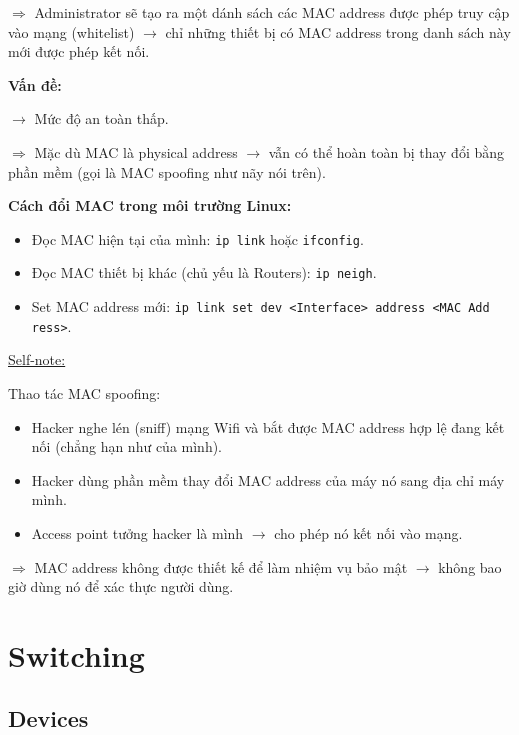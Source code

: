 $\Rightarrow$ Administrator sẽ tạo ra một dánh sách các MAC address được phép truy cập vào mạng (whitelist) $\rightarrow$ chỉ những thiết bị có MAC address trong danh sách này mới được phép kết nối.
\medskip

\noindent
\textbf{Vấn đề:}
\medskip

\noindent
$\rightarrow$ Mức độ an toàn thấp.

$\Rightarrow$ Mặc dù MAC là physical address $\rightarrow$ vẫn có thể hoàn toàn bị thay đổi bằng phần mềm (gọi là MAC spoofing như nãy nói trên).
\medskip

\noindent
\textbf{Cách đổi MAC trong môi trường Linux:}

\begin{itemize}
    \item Đọc MAC hiện tại của mình: \texttt{ip link} hoặc \texttt{ifconfig}.
    \item Đọc MAC thiết bị khác (chủ yếu là Routers): \texttt{ip neigh}.
    \item Set MAC address mới: \texttt{ip link set dev <Interface> address <MAC Add\\ress>}.
\end{itemize}
\medskip

\noindent
\underline{Self-note:}
\medskip

\noindent
Thao tác MAC spoofing:

\begin{itemize}
    \item Hacker nghe lén (sniff) mạng Wifi và bắt được MAC address hợp lệ đang kết nối (chẳng hạn như của mình).
    \item Hacker dùng phần mềm thay đổi MAC address của máy nó sang địa chỉ máy mình.
    \item Access point tưởng hacker là mình $\rightarrow$ cho phép nó kết nối vào mạng.
\end{itemize}
\medskip

\noindent
$\Rightarrow$ MAC address không được thiết kế để làm nhiệm vụ bảo mật $\rightarrow$ không bao giờ dùng nó để xác thực người dùng.
\medskip

\section{Switching}

\subsection{Devices}

